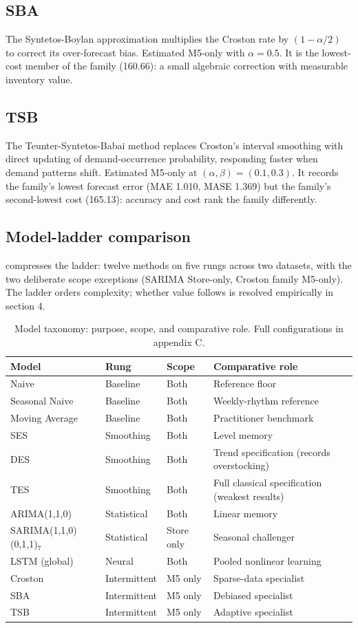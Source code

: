 \subsection{SBA}
\label{sec:m-sba}
The Syntetos-Boylan approximation \citep{syntetos2005} multiplies the Croston
rate by $(1-\alpha/2)$ to correct its over-forecast bias. Estimated M5-only
with $\alpha=0.5$. It is the lowest-cost member of the family (160.66): a
small algebraic correction with measurable inventory value.

\subsection{TSB}
\label{sec:m-tsb}
The Teunter-Syntetos-Babai method \citep{teunter2011} replaces Croston's
interval smoothing with direct updating of demand-occurrence probability,
responding faster when demand patterns shift. Estimated M5-only at
$(\alpha,\beta)=(0.1,0.3)$. It records the family's lowest forecast error
(MAE 1.010, MASE 1.369) but the family's second-lowest cost (165.13): accuracy
and cost rank the family differently.

\subsection{Model-ladder comparison}
\label{sec:ladder-compare}
 compresses the ladder: twelve methods on five rungs
across two datasets, with the two deliberate scope exceptions (SARIMA
Store-only, Croston family M5-only). The ladder orders complexity; whether
value follows is resolved empirically in section 4.

\begin{table}[H]
\centering
\caption{Model taxonomy: purpose, scope, and comparative role. Full configurations in appendix C.}
\label{tab:taxonomy}
\begin{tabular}{llll}
\toprule
Model & Rung & Scope & Comparative role \\
\midrule
Naive & Baseline & Both & Reference floor \\
Seasonal Naive & Baseline & Both & Weekly-rhythm reference \\
Moving Average & Baseline & Both & Practitioner benchmark \\
SES & Smoothing & Both & Level memory \\
DES & Smoothing & Both & Trend specification (records overstocking) \\
TES & Smoothing & Both & Full classical specification (weakest results) \\
ARIMA(1,1,0) & Statistical & Both & Linear memory \\
SARIMA(1,1,0)(0,1,1)$_7$ & Statistical & Store only & Seasonal challenger \\
LSTM (global) & Neural & Both & Pooled nonlinear learning \\
Croston & Intermittent & M5 only & Sparse-data specialist \\
SBA & Intermittent & M5 only & Debiased specialist \\
TSB & Intermittent & M5 only & Adaptive specialist \\
\bottomrule
\end{tabular}
\end{table}

